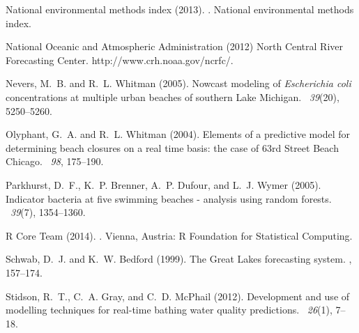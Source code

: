 \documentclass[authoryear,review, 12pt]{elsarticle}
\begin{document}
\begin{thebibliography}{}
National environmental methods index (2013).
.
\newblock National environmental methods index.

{National Oceanic and Atmospheric Administration} (2012)
\newblock North {C}entral {R}iver {F}orecasting {C}enter. 
\newblock http://www.crh.noaa.gov/ncrfc/.

Nevers, M.~B. and R.~L. Whitman (2005).
\newblock Nowcast modeling of \emph{{E}scherichia coli} concentrations at multiple
  urban beaches of southern {Lake Michigan}.
~{\em 39\/}(20), 5250--5260.

Olyphant, G.~A. and R.~L. Whitman (2004).
\newblock Elements of a predictive model for determining beach closures on a
  real time basis: the case of 63rd {S}treet {B}each {C}hicago.
~{\em 98}, 175--190.

Parkhurst, D.~F., K.~P. Brenner, A.~P. Dufour, and L.~J. Wymer (2005).
\newblock Indicator bacteria at five swimming beaches - analysis using random
  forests.
~{\em 39\/}(7), 1354--1360.

{R Core Team} (2014).
.
\newblock Vienna, Austria: R Foundation for Statistical Computing.

Schwab, D.~J. and K.~W. Bedford (1999).
\newblock The {Great Lakes} forecasting system.
, 157--174.

Stidson, R.~T., C.~A. Gray, and C.~D. McPhail (2012).
\newblock Development and use of modelling techniques for real-time bathing
  water quality predictions.
~{\em 26\/}(1), 7--18.


\end{thebibliography}
\end{document}
